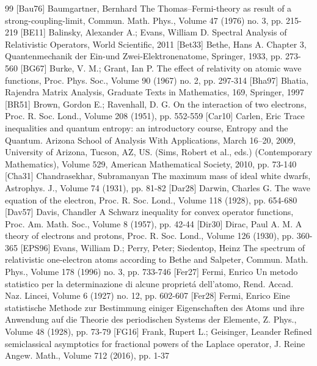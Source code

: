 \documentclass[10pt]{amsart}
\theoremstyle{definition}
\begin{document}
\begin{thebibliography}{99}
 [Bau76] Baumgartner, Bernhard The Thomas–Fermi-theory as result of a strong-coupling-limit, Commun. Math. Phys., Volume 47 (1976) no. 3, pp. 215-219
 [BE11] Balinsky, Alexander A.; Evans, William D. Spectral Analysis of Relativistic Operators, World Scientific, 2011
 [Bet33] Bethe, Hans A. Chapter 3, Quantenmechanik der Ein-und Zwei-Elektronenatome, Springer, 1933, pp. 273-560
 [BG67] Burke, V. M.; Grant, Ian P. The effect of relativity on atomic wave functions, Proc. Phys. Soc., Volume 90 (1967) no. 2, pp. 297-314
 [Bha97] Bhatia, Rajendra Matrix Analysis, Graduate Texts in Mathematics, 169, Springer, 1997
 [BR51] Brown, Gordon E.; Ravenhall, D. G. On the interaction of two electrons, Proc. R. Soc. Lond., Volume 208 (1951), pp. 552-559
 [Car10] Carlen, Eric Trace inequalities and quantum entropy: an introductory course, Entropy and the Quantum. Arizona School of Analysis With Applications, March 16–20, 2009, University of Arizona, Tucson, AZ, US. (Sims, Robert et al., eds.) (Contemporary Mathematics), Volume 529, American Mathematical Society, 2010, pp. 73-140
 [Cha31] Chandrasekhar, Subramanyan The maximum mass of ideal white dwarfs, Astrophys. J., Volume 74 (1931), pp. 81-82
 [Dar28] Darwin, Charles G. The wave equation of the electron, Proc. R. Soc. Lond., Volume 118 (1928), pp. 654-680
 [Dav57] Davis, Chandler A Schwarz inequality for convex operator functions, Proc. Am. Math. Soc., Volume 8 (1957), pp. 42-44
 [Dir30] Dirac, Paul A. M. A theory of electrons and protons, Proc. R. Soc. Lond., Volume 126 (1930), pp. 360-365
 [EPS96] Evans, William D.; Perry, Peter; Siedentop, Heinz The spectrum of relativistic one-electron atoms according to Bethe and Salpeter, Commun. Math. Phys., Volume 178 (1996) no. 3, pp. 733-746
 [Fer27] Fermi, Enrico Un metodo statistico per la determinazione di alcune proprietá dell’atomo, Rend. Accad. Naz. Lincei, Volume 6 (1927) no. 12, pp. 602-607
 [Fer28] Fermi, Enrico Eine statistische Methode zur Bestimmung einiger Eigenschaften des Atoms und ihre Anwendung auf die Theorie des periodischen Systems der Elemente, Z. Phys., Volume 48 (1928), pp. 73-79
 [FG16] Frank, Rupert L.; Geisinger, Leander Refined semiclassical asymptotics for fractional powers of the Laplace operator, J. Reine Angew. Math., Volume 712 (2016), pp. 1-37

\end{thebibliography}
\end{document}
